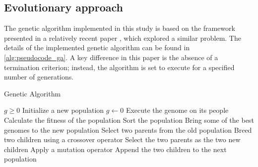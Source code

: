 
\subsection{Evolutionary approach}

    The genetic algorithm implemented in this study is based on the framework presented in a relatively recent paper \cite{tartan2016flow}, which explored a similar problem. The details of the implemented genetic algorithm can be found in \ref{alg:pseudocode_ga}. A key difference in this paper is the absence of a termination criterion; instead, the algorithm is set to execute for a specified number of generations.

    \begin{algorithm}
        \caption{Genetic Algorithm}\label{alg:pseudocode_ga}
        \begin{algorithmic}
        \Require $g \geq 0$
        \State Initialize a new population
        \State $g \gets 0$
                \State Execute the genome on its people
            \EndFor
            \State Calculate the fitness of the population
            \State Sort the population
             
                \State Bring some of the best genomes to the new population
            \EndIf
                \State Select two parents from the old population
                    \State Breed two children using a crossover operator
                \Else
                    \State Select the two parents as the two new children
                \EndIf
                        \State Apply a mutation operator
                    \EndIf
                \EndFor
                \State Append the two children to the next population
            \EndWhile
        \EndWhile
        \end{algorithmic}
    \end{algorithm}

